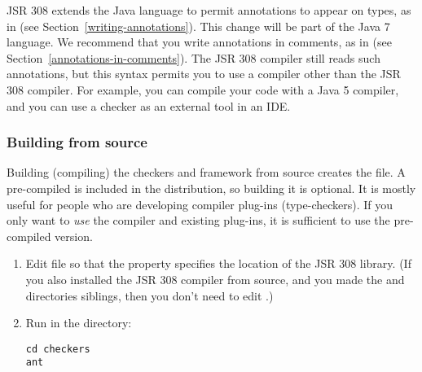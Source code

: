 JSR 308 extends the Java language to permit annotations to appear on types,
as in  (see Section~\ref{writing-annotations}).
This change will be part of the Java 7 language.  We recommend that you
write annotations in comments, as in  (see
Section~\ref{annotations-in-comments}).  The JSR 308 compiler still reads
such annotations, but this syntax permits you to use a compiler other than
the JSR 308 compiler.  For example, you can compile your code with a Java 5
compiler, and you can use a checker as an external tool in an IDE.




\subsubsection{Building from source\label{building}}

Building (compiling) the checkers and framework from source creates the
 file.  A pre-compiled  is included
in the distribution, so building it is optional.  It is mostly useful for
people who are developing compiler plug-ins (type-checkers).  If you only
want to \emph{use} the compiler and existing plug-ins, it is sufficient to
use the pre-compiled version.

\begin{enumerate}
\item
Edit  file so that the
 property specifies the location of the JSR 308
 library.  (If you also installed the JSR 308 compiler from
source, and you made the  and  directories
siblings, then you don't need to edit .)

\item
Run  in the  directory:

\begin{Verbatim}
cd checkers
ant
\end{Verbatim}

\end{enumerate}


